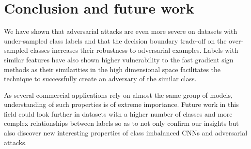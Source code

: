 \documentclass[runningheads,a4paper]{llncs}
\begin{document}
\section{Conclusion and future work}

We have shown that adversarial attacks are even more severe on datasets with under-sampled class labels and that the decision boundary trade-off on the over-sampled classes increases their robustness to adversarial examples. Labels with similar features have also shown higher vulnerability to the fast gradient sign methods as their similarities in the high dimensional space facilitates the technique to successfully create an adversary of the similar class. 

As several commercial applications rely on almost the same group of models, understanding of such properties is of extreme importance. Future work in this field could look further in datasets with a higher number of classes and more complex relationships between labels so as to not only confirm our insights but also discover new interesting properties of class imbalanced CNNs and adversarial attacks. 



\end{document}
